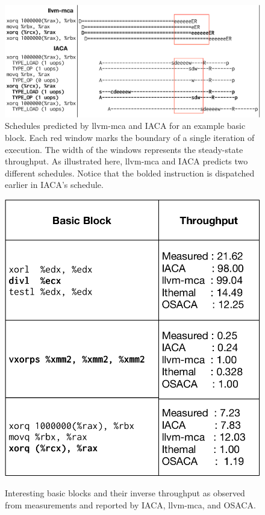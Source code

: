 \begin{figure}[htbp!]
    \includegraphics[width=0.95\columnwidth]{figures/scheduling.pdf}
    \caption{Schedules predicted by llvm-mca and IACA for an example basic block.
    Each red window marks the boundary of a single iteration of execution.
    The width of the windows represents the steady-state throughput.
    As illustrated here, llvm-mca and IACA predicts two different schedules.
    Notice that the bolded instruction is dispatched earlier in IACA's schedule.
    }
    \label{tab:case-study}
\end{figure}

\begin{figure}[htbp!]
    \begin{center}
    \includegraphics[width=0.7\columnwidth]{figures/interesting-examples.pdf}
    \caption{Interesting basic blocks and their inverse throughput as observed from measurements and reported by IACA, llvm-mca, and OSACA.}
    \label{tab:case-study}
    \label{fig:schedule}
    \end{center}
\end{figure}